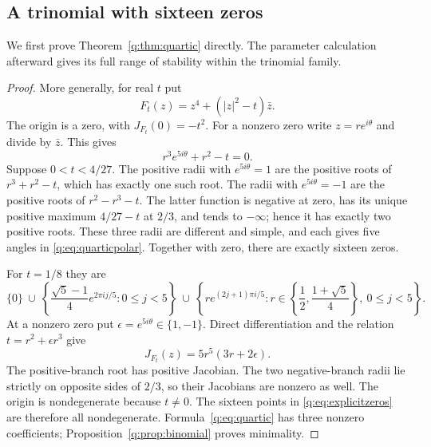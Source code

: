 \documentclass[UTF8,11pt]{ctexart}
\theoremstyle{definition}
\numberwithin{equation}{section}
\begin{document}
\subsection{A trinomial with sixteen zeros}\label{q:sec:quartic}
We first prove Theorem~\ref{q:thm:quartic} directly. The parameter
calculation afterward gives its full range of stability within the
trinomial family.
\begin{proof}
More generally, for real $t$ put
\[
 F_t(z)=z^4+(|z|^2-t)\bar z.
\]
The origin is a zero, with $J_{F_t}(0)=-t^2$. For a nonzero zero write
$z=re^{i\theta}$ and divide by $\bar z$. This gives
\begin{equation}\label{q:eq:quarticpolar}
 r^3e^{5i\theta}+r^2-t=0.
\end{equation}
Suppose $0<t<4/27$. The positive radii with $e^{5i\theta}=1$ are the
positive roots of $r^3+r^2-t$, which has exactly one such root. The
radii with $e^{5i\theta}=-1$ are the positive roots of
$r^2-r^3-t$. The latter function is negative at zero, has its unique
positive maximum $4/27-t$ at $2/3$, and tends to $-\infty$; hence it has
exactly two positive roots. These three radii are different and simple,
and each gives five angles in \eqref{q:eq:quarticpolar}. Together with
zero, there are exactly sixteen zeros.

For $t=1/8$ they are
\begin{equation}\label{q:eq:explicitzeros}
 \{0\}\ \cup\
 \left\{\frac{\sqrt5-1}{4}e^{2\pi ij/5}:0\le j<5\right\}
 \ \cup\
 \left\{r e^{(2j+1)\pi i/5}:
     r\in\left\{\frac12,\frac{1+\sqrt5}{4}\right\},\ 0\le j<5\right\}.
\end{equation}
At a nonzero zero put $\epsilon=e^{5i\theta}\in\{1,-1\}$. Direct
differentiation and the relation $t=r^2+\epsilon r^3$ give
\[
 J_{F_t}(z)=5r^5(3r+2\epsilon).
\]
The positive-branch root has positive Jacobian. The two negative-branch
radii lie strictly on opposite sides of $2/3$, so their Jacobians are
nonzero as well. The origin is nondegenerate because $t\ne0$.
The sixteen points in \eqref{q:eq:explicitzeros} are therefore all
nondegenerate. Formula~\eqref{q:eq:quartic} has three nonzero coefficients;
Proposition~\ref{q:prop:binomial} proves minimality.
\end{proof}
\end{document}
